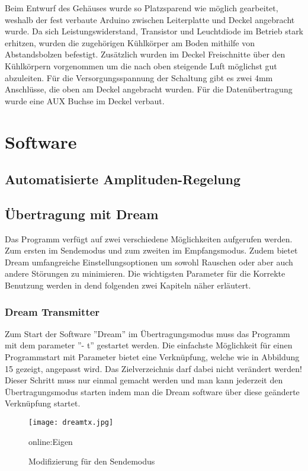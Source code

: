 Beim Entwurf des Gehäuses wurde so Platzsparend wie möglich gearbeitet, weshalb
der fest verbaute Arduino zwischen Leiterplatte und Deckel angebracht wurde.
Da sich Leistungswiderstand, Transistor und Leuchtdiode im Betrieb stark erhitzen,
wurden die zugehörigen Kühlkörper am Boden mithilfe von Abstandsbolzen
befestigt. Zusätzlich wurden im Deckel Freischnitte über den Kühlkörpern vorgenommen
um die nach oben steigende Luft möglichst gut abzuleiten. Für die
Versorgungsspannung der Schaltung gibt es zwei 4mm Anschlüsse, die oben am
Deckel angebracht wurden. Für die Datenübertragung wurde eine AUX Buchse im
Deckel verbaut.

\section{Software}
\label{sec:Software}
\subsection{Automatisierte Amplituden-Regelung}
\label{subsec:Unterabschnitt12}


\subsection{Übertragung mit Dream}
\label{subsec:dream}

Das Programm verfügt auf zwei verschiedene Möglichkeiten aufgerufen werden. Zum ersten im Sendemodus und zum zweiten im Empfangsmodus. Zudem bietet Dream umfangreiche Einstellungsoptionen um sowohl Rauschen oder aber auch andere Störungen zu minimieren. Die wichtigsten Parameter für die Korrekte Benutzung werden in dend
folgenden zwei Kapiteln näher erläutert.



\subsubsection{Dream Transmitter}
\label{subsubsec:dreamtx}
Zum Start der Software ”Dream” im Übertragungsmodus muss das Programm mit dem parameter ”- t” gestartet werden. Die einfachste Möglichkeit für einen Programmstart mit Parameter bietet eine Verknüpfung, welche wie in Abbildung 15 gezeigt, angepasst wird. Das Zielverzeichnis darf dabei nicht verändert werden! Dieser Schritt muss nur einmal gemacht werden und man kann jederzeit den Übertragungsmodus starten indem man die Dream software über diese geänderte Verknüpfung startet.

\begin{figure}[H]
	\centering
	\texttt{[image: dreamtx.jpg]}
	\caption[Modifizierung für den Sendemodus]{Modifizierung für den Sendemodus} \gls{online:Eigen}
	\label{fig:dreamtx}
\end{figure}

